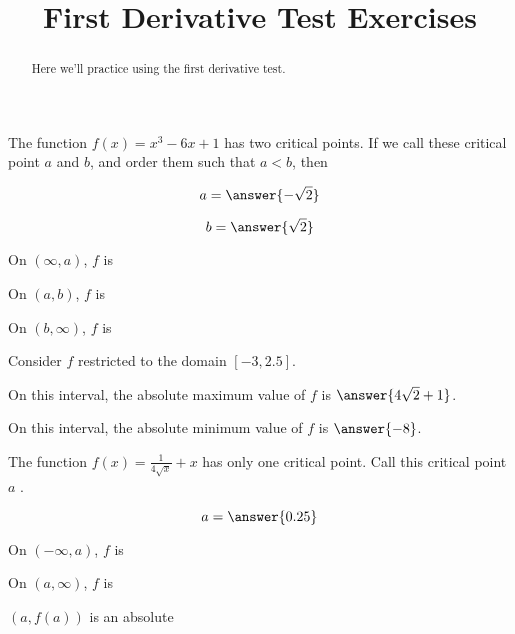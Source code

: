 \documentclass[handout]{ximera}
\title{First Derivative Test Exercises}
\begin{document}
\begin{abstract}
  Here we'll practice using the first derivative test.
\end{abstract}
\maketitle

\begin{exercise}
The function $f(x) = x^3-6x+1$ has two critical points.  If we call these critical point $a$ and $b$, and order them such that $a < b$, then

$$
a = \answer{-\sqrt{2}}
$$

$$
b=\answer{\sqrt{2}}
$$

On $(\infty,a)$, $f$ is 

On $(a,b)$, $f$ is 

On $(b,\infty)$, $f$ is 


Consider $f$ restricted to the domain $[-3,2.5]$.

On this interval, the absolute maximum value of $f$ is $\answer{4\sqrt{2}+1}$.

On this interval, the absolute minimum value of $f$ is $\answer{-8}$.

\end{exercise}

\begin{exercise}
The function $f(x) =\displaystyle\frac{1}{4\sqrt{x}}+x$ has only one critical point.  Call this critical point $a$ .

$$
a = \answer{0.25}
$$

On $(-\infty,a)$, $f$ is 

On $(a,\infty)$, $f$ is 

$(a,f(a))$ is an absolute 

\end{exercise}
\end{document}
